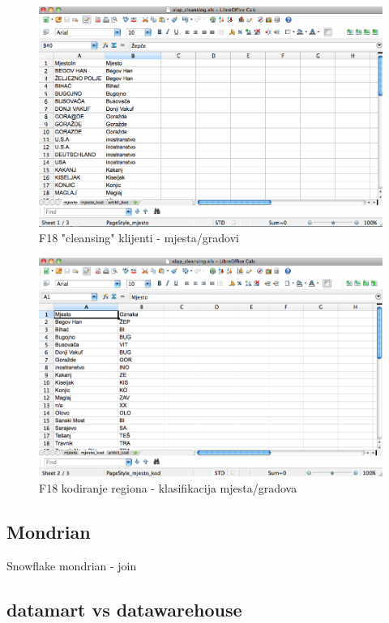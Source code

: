 \documentclass[times, utf8, seminar]{fit}
\begin{document}
\begin{figure}[H]
\centering
\includegraphics[width=15cm]{img/clean_mjesto.png}
\caption{F18 "cleansing" klijenti - mjesta/gradovi}
\end{figure}


\begin{figure}[H]
\centering
\includegraphics[width=15cm]{img/clean_mjesto_region.png}
\caption{F18 kodiranje regiona - klasifikacija mjesta/gradova}
\end{figure}




\subsection{Mondrian}

Snowflake mondrian - join

\cite{web:pentaho:mondrian_schema}

\subsection{datamart vs datawarehouse}
\end{document}
